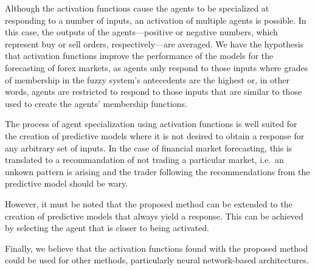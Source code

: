 \documentclass{ieeeaccess}
\begin{document}
Although the activation functions cause the agents to be specialized at
responding to a number of inputs, an activation of multiple agents is
possible. %
In this case, the outputs of the agents---positive or negative
numbers, which represent buy or sell orders, respectively---are
averaged. We have the hypothesis that activation functions improve the
performance of the models for the forecasting of forex markets, as
agents only respond to those inputs where grades of membership in the
fuzzy system's antecedents are the highest or, in other words, agents
are restricted to respond to those inputs that are similar to those used
to create the agents' membership functions.


The process of agent specialization using activation functions is well suited
for the creation of predictive models where it is not desired to obtain a
response for any arbitrary set of inputs. In the case of financial market
forecasting, this is translated to a recommandation of not trading a
particular market, i.e.\ an unkown pattern is arising and the trader following
the recommendations from the predictive model should be wary.

However, it must be noted that the proposed method can be extended to the
creation of predictive models that always yield a response. This can be
achieved by selecting the agent that is closer to being activated.

Finally, we believe that the activation functions found with the
proposed method could be used for other methods, particularly neural
network-based architectures.

\end{document}

